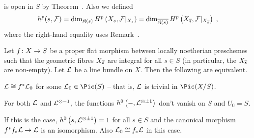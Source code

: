 \documentclass[a4paper,parskip=half,numbers=enddot, DIV=12]{scrreprt}
\begin{document}
is open in $S$ by Theorem~. Also we defined
\begin{align*}
	h^p(s,\mathcal{F})=\dim_{\mathfrak{K}(s)}H^p\left(X_s,\mathcal{F}|_{X_s}\right)=\dim_{\overline{\mathfrak{K}(s)}}H^p\left(X_{\overline{s}},\mathcal{F}|_{X_{\overline{s}}}\right)\;,
\end{align*}
where the right-hand equality uses Remark~.
\begin{prop}
	Let $f\colon X\morphism S$ be a proper flat morphism between locally noetherian preschemes such that the geometric fibres $X_{\overline{s}}$ are integral for all $s\in S$ (in particular, the $X_{\overline{s}}$ are non-empty). Let $\mathcal{L}$ be a line bundle on $X$. Then the following are equivalent.
	\begin{alphanumerate}
		\item $\mathcal{L}\cong f^*\mathcal{L}_0$ for some $\Ll_0\in\Pic(S)$ -- that is, $\mathcal{L}$ is trivial in $\Pic(X/S)$.
		\item For both $\mathcal{L}$ and $\mathcal{L}^{\otimes -1}$, the functions $h^0\left(-,\mathcal{L}^{\otimes \pm 1}\right)$ don't vanish on $S$ and $U_0=S$.
	\end{alphanumerate}
	If this is the case, $h^0\left(s,\mathcal{L}^{\otimes\pm1}\right)=1$ for all $s\in S$ and the canonical morphism $f^*f_*\Ll\morphism\Ll$ is an isomorphism. Also $\mathcal{L}_0\cong f_*\mathcal{L}$ in this case.
\end{prop}
\end{document}
